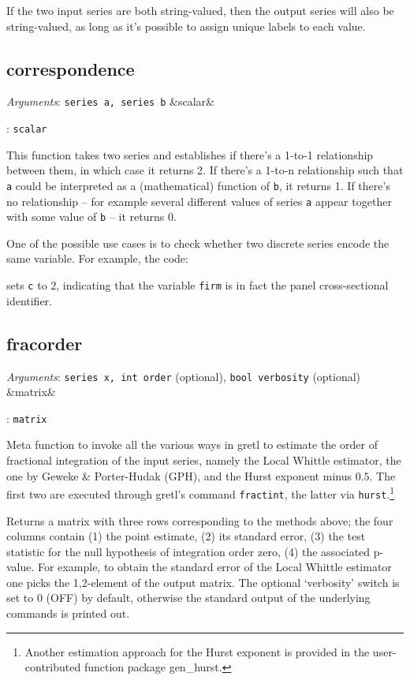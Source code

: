 \documentclass[11pt,english]{article}
\newcommand{\ArgRet}[2]{%
  {\it Arguments}: {#1}%
  \ifx&#2&%
  \else
  \par\smallskip\noindent {\it Return type}: \texttt{#2}
  \fi%
  \par\medskip\par%
  }
\begin{document}
If the two input series are both string-valued, then the output series
will also be string-valued, as long as it's possible to assign unique
labels to each value.

\subsection{correspondence}

\ArgRet{\texttt{series a, series b}}{scalar}

This function takes two series and establishes if there's a 1-to-1
relationship between them, in which case it returns 2.  If there's a
1-to-n relationship such that \texttt{a} could be interpreted as a
(mathematical) function of \texttt{b}, it returns 1. If there's no
relationship -- for example several different values of series
\texttt{a} appear together with some value of \texttt{b} -- it returns
0.

One of the possible use cases is to check whether two discrete series encode
the same variable. For example, the code:
sets \texttt{c} to 2, indicating that the variable \texttt{firm} is in fact the
panel cross-sectional identifier.

\subsection{fracorder}

\ArgRet{\texttt{series x, int order} (optional), \texttt{bool verbosity}
 (optional)}{matrix}

Meta function to invoke all the various ways in gretl to estimate the
order of fractional integration of the input series, namely the Local
Whittle estimator, the one by Geweke \& Porter-Hudak (GPH), and the
Hurst exponent minus $0.5$.  The first two are executed through
gretl's command \texttt{fractint}, the latter via
\texttt{hurst}.\footnote{Another estimation approach for the Hurst
  exponent is provided in the user-contributed function package
  \textsf{gen\_hurst}.}

Returns a matrix with three rows corresponding to the methods above;
the four columns contain (1) the point estimate, (2) its standard
error, (3) the test statistic for the null hypothesis of integration
order zero, (4) the associated p-value. For example, to obtain the
standard error of the Local Whittle estimator one picks the
1,2-element of the output matrix. The optional `verbosity' switch is
set to 0 (OFF) by default, otherwise the standard output of the
underlying commands is printed out.
\end{document}
